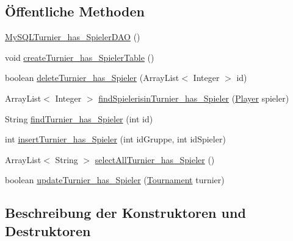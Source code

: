 \subsection*{Öffentliche Methoden}
\begin{DoxyCompactItemize}
\item 
\hyperlink{classde_1_1turnierverwaltung_1_1mysql_1_1_my_s_q_l_turnier__has___spieler_d_a_o_a034639615047412481cbbd6a630141d0}{My\+S\+Q\+L\+Turnier\+\_\+has\+\_\+\+Spieler\+D\+AO} ()
\item 
void \hyperlink{classde_1_1turnierverwaltung_1_1mysql_1_1_my_s_q_l_turnier__has___spieler_d_a_o_ac0b504e3c15bf250145d0428d731c8f7}{create\+Turnier\+\_\+has\+\_\+\+Spieler\+Table} ()
\item 
boolean \hyperlink{classde_1_1turnierverwaltung_1_1mysql_1_1_my_s_q_l_turnier__has___spieler_d_a_o_ab31fbe1cbfbd11ea3d51af4a9cc86bca}{delete\+Turnier\+\_\+has\+\_\+\+Spieler} (Array\+List$<$ Integer $>$ id)
\item 
Array\+List$<$ Integer $>$ \hyperlink{classde_1_1turnierverwaltung_1_1mysql_1_1_my_s_q_l_turnier__has___spieler_d_a_o_a583d2d6a743595c5539ccd542d32ae91}{find\+Spielerisin\+Turnier\+\_\+has\+\_\+\+Spieler} (\hyperlink{classde_1_1turnierverwaltung_1_1model_1_1_player}{Player} spieler)
\item 
String \hyperlink{classde_1_1turnierverwaltung_1_1mysql_1_1_my_s_q_l_turnier__has___spieler_d_a_o_aa1eacc76a3025738f39fdbbe687814fd}{find\+Turnier\+\_\+has\+\_\+\+Spieler} (int id)
\item 
int \hyperlink{classde_1_1turnierverwaltung_1_1mysql_1_1_my_s_q_l_turnier__has___spieler_d_a_o_ae8db0f67ecb02b7676651ddb9359b091}{insert\+Turnier\+\_\+has\+\_\+\+Spieler} (int id\+Gruppe, int id\+Spieler)
\item 
Array\+List$<$ String $>$ \hyperlink{classde_1_1turnierverwaltung_1_1mysql_1_1_my_s_q_l_turnier__has___spieler_d_a_o_a364af7d6b83c58c94d6f6a66f72ba3b0}{select\+All\+Turnier\+\_\+has\+\_\+\+Spieler} ()
\item 
boolean \hyperlink{classde_1_1turnierverwaltung_1_1mysql_1_1_my_s_q_l_turnier__has___spieler_d_a_o_aa219a3340c0424cf67e675f1170c838d}{update\+Turnier\+\_\+has\+\_\+\+Spieler} (\hyperlink{classde_1_1turnierverwaltung_1_1model_1_1_tournament}{Tournament} turnier)
\end{DoxyCompactItemize}


\subsection{Beschreibung der Konstruktoren und Destruktoren}
